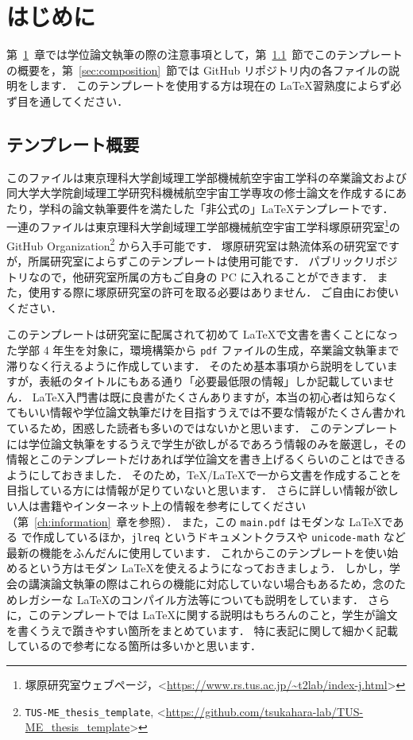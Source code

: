 \chapter{はじめに}
\label{ch:introduction}

第~\ref{ch:introduction}~章では学位論文執筆の際の注意事項として，第~\ref{sec:template}~節でこのテンプレートの概要を，第~\ref{sec:composition}~節では GitHub リポジトリ内の各ファイルの説明をします．
このテンプレートを使用する方は現在の \LaTeX 習熟度によらず必ず目を通してください．

\section{テンプレート概要}
\label{sec:template}

このファイルは東京理科大学創域理工学部機械航空宇宙工学科の卒業論文および同大学大学院創域理工学研究科機械航空宇宙工学専攻の修士論文を作成するにあたり，学科の論文執筆要件を満たした「非公式の」\LaTeX テンプレートです．
一連のファイルは東京理科大学創域理工学部機械航空宇宙工学科塚原研究室\footnote{塚原研究室ウェブページ，\textless\url{https://www.rs.tus.ac.jp/~t2lab/index-j.html}\textgreater}の GitHub Organization\footnote{\texttt{TUS-ME\_thesis\_template}, \textless\url{https://github.com/tsukahara-lab/TUS-ME_thesis_template}\textgreater} から入手可能です．
塚原研究室は熱流体系の研究室ですが，所属研究室によらずこのテンプレートは使用可能です．
パブリックリポジトリなので，他研究室所属の方もご自身の PC に入れることができます．
また，使用する際に塚原研究室の許可を取る必要はありません．
ご自由にお使いください．

このテンプレートは研究室に配属されて初めて \LaTeX で文書を書くことになった学部 4 年生を対象に，環境構築から \verb|pdf| ファイルの生成，卒業論文執筆まで滞りなく行えるように作成しています．
そのため基本事項から説明をしていますが，表紙のタイトルにもある通り「必要最低限の情報」しか記載していません．
\LaTeX 入門書は既に良書がたくさんありますが，本当の初心者は知らなくてもいい情報や学位論文執筆だけを目指すうえでは不要な情報がたくさん書かれているため，困惑した読者も多いのではないかと思います．
このテンプレートには学位論文執筆をするうえで学生が欲しがるであろう情報のみを厳選し，その情報とこのテンプレートだけあれば学位論文を書き上げるくらいのことはできるようにしておきました．
そのため，\TeX/\LaTeX で一から文書を作成することを目指している方には情報が足りていないと思います．
さらに詳しい情報が欲しい人は書籍やインターネット上の情報を参考にしてください（第~\ref{ch:information}~章を参照）．
また，この \verb|main.pdf| はモダンな \LaTeX である \LuaLaTeX で作成しているほか，\verb|jlreq| というドキュメントクラスや \verb|unicode-math| など最新の機能をふんだんに使用しています．
これからこのテンプレートを使い始めるという方はモダン \LaTeX を使えるようになっておきましょう．
しかし，学会の講演論文執筆の際はこれらの機能に対応していない場合もあるため，念のためレガシーな \LaTeX のコンパイル方法等についても説明をしています．
さらに，このテンプレートでは \LaTeX に関する説明はもちろんのこと，学生が論文を書くうえで躓きやすい箇所をまとめています．
特に表記に関して細かく記載しているので参考になる箇所は多いかと思います．

